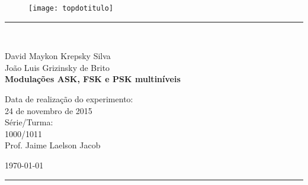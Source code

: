 \begin{titlepage}
\begin{center}
\begin{figure}[h]
\texttt{[image: topdotitulo]}
\end{figure}
\rule{\columnwidth}{1.5mm}
\

\large David Maykon Krepsky Silva \\
\large João Luis Grizinsky de Brito \\

\vspace{4cm}
{\bf \Large Modulações ASK, FSK e PSK multiníveis}
\vspace{3.5cm}

\begin{flushright}
Data de realização do experimento:\\
24 de novembro de 2015\\
Série/Turma:\\
1000/1011\\
Prof. Jaime Laelson Jacob
\end{flushright}

\vspace{3.2cm}
\today

\rule{\columnwidth}{1.3mm}
\end{center}
\end{titlepage}